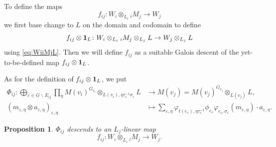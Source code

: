 \documentclass[a4paper,12pt,reqno]{amsart}
\theoremstyle{plain}
\newtheorem{proposition}[theorem]{Proposition}
\theoremstyle{remark}
\begin{document}
    To define the maps
    \[f_{ij} \colon W_i \otimes_{L_i} {}_iM_j \to W_j\]
    we first base change to $L$ on the domain and codomain to define
    \[f_{ij}\otimes{\bf1}_L \colon W_i \otimes_{L_i} {}_iM_j\otimes_{L_j}L \to W_j\otimes_{L_j}L\]
    using \eqref{eq:WiiMjL}. Then we will define $f_{ij}$ as a suitable Galois descent of the yet-to-be-defined map $f_{ij}\otimes{\bf1}_L$.
    
    As for the definition of $f_{ij}\otimes{\bf1}_L$, we put
    \begin{align*}
    \Phi_{ij}\colon
    \bigoplus_{\varepsilon\in G\backslash E_{ij}}
    \prod_{\eta}
    M(v_i)^{G_{v_i}} \otimes_{L(v_i),\eta\tau_\varepsilon^{-1}\sigma_\varepsilon}L
    &\to
    M(v_j)=M(v_j)^{G_{v_j}}\otimes_{L(v_j)}L,\\
    (m_{\varepsilon,\eta}\otimes a_{\varepsilon,\eta})_{\varepsilon,\eta}&\mapsto
    \sum_{\varepsilon,\eta}
    \varphi_{t(e_\varepsilon),\eta\tau_\varepsilon^{-1}}\phi_{e_\varepsilon}\varphi_{e_i,\sigma_\varepsilon}(m_{\varepsilon,\eta})\cdot a_{\varepsilon,\eta}.
    \end{align*}

    \begin{proposition}
      $\Phi_{ij}$ descends to an $L_j$-linear map
      \[
      f_{ij}\colon W_i \otimes_{L_i} {}_iM_j \to W_j.
      \]
    \end{proposition}
\end{document}
